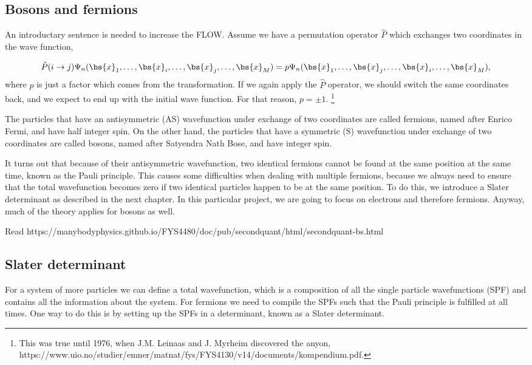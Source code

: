 \subsection{Bosons and fermions} \label{subsubsec:symmetry}
An introductary sentence is needed to increase the FLOW. 
Assume we have a permutation operator $\hat{P}$ which exchanges two coordinates in the wave function,

\begin{equation}
\hat{P}(i\rightarrow j)\Psi_n(\bs{x}_1,\hdots,\bs{x}_i,\hdots,\bs{x}_j,\hdots,\bs{x}_M)=p\Psi_n(\bs{x}_1,\hdots,\bs{x}_j,\hdots,\bs{x}_i,\hdots,\bs{x}_M),
\end{equation}
where $p$ is just a factor which comes from the transformation. If we again apply the $\hat{P}$ operator, we should switch the same coordinates back, and we expect to end up with the initial wave function. For that reason, $p=\pm1$. \footnote{This was true until 1976, when J.M. Leinaas and J. Myrheim discovered the anyon, https://www.uio.no/studier/emner/matnat/fys/FYS4130/v14/documents/kompendium.pdf.}

The particles that have an antisymmetric (AS) wavefunction under exchange of two coordinates are called fermions, named after Enrico Fermi, and have half integer spin. On the other hand, the particles that have a symmetric (S) wavefunction under exchange of two coordinates are called bosons, named after Satyendra Nath Bose, and have integer spin. 

It turns out that because of their antisymmetric wavefunction, two identical fermions cannot be found at the same position at the same time, known as the Pauli principle. This causes some difficulties when dealing with multiple fermions, because we always need to ensure that the total wavefunction becomes zero if two identical particles happen to be at the same position. To do this, we introduce a Slater determinant as described in the next chapter. In this particular project, we are going to focus on electrons and therefore fermions. Anyway, much of the theory applies for bosons as well.

Read https://manybodyphysics.github.io/FYS4480/doc/pub/secondquant/html/secondquant-bs.html

\subsection{Slater determinant} \label{subsubsec:slater}
For a system of more particles we can define a total wavefunction, which is a composition of all the single particle wavefunctions (SPF) and contains all the information about the system. For fermions we need to compile the SPFs such that the Pauli principle is fulfilled at all times. One way to do this is by setting up the SPFs in a determinant, known as a Slater determinant.

